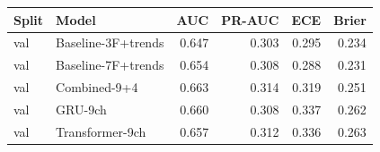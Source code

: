 \begin{tabular}{llrrrr}
\toprule
Split & Model & AUC & PR-AUC & ECE & Brier \\
\midrule
val & Baseline-3F+trends & 0.647 & 0.303 & 0.295 & 0.234 \\
val & Baseline-7F+trends & 0.654 & 0.308 & 0.288 & 0.231 \\
val & Combined-9+4 & 0.663 & 0.314 & 0.319 & 0.251 \\
val & GRU-9ch & 0.660 & 0.308 & 0.337 & 0.262 \\
val & Transformer-9ch & 0.657 & 0.312 & 0.336 & 0.263 \\
\bottomrule
\end{tabular}
